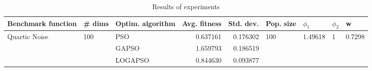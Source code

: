 \begin{table}
\centering
\caption{Results of experiments}
\begin{tabular}{lllrrllll}
\toprule
            Benchmark function &              \# dims & Optim. algorithm &  Avg. fitness &  Std. dev. &            Pop. size &               $\phi_{1}$ &         $\phi_{2}$ &                       w \\
\midrule
\multirow{3}{*}{Quartic Noise} & \multirow{3}{*}{100} &              PSO &      0.637161 &   0.176302 & \multirow{3}{*}{100} & \multirow{3}{*}{1.49618} & \multirow{3}{*}{1} & \multirow{3}{*}{0.7298} \\
                               &                      &            GAPSO &      1.659793 &   0.186519 &                      &                          &                    &                         \\
                               &                      &          LOGAPSO &      0.844630 &   0.093877 &                      &                          &                    &                         \\
\bottomrule
\end{tabular}
\end{table}
